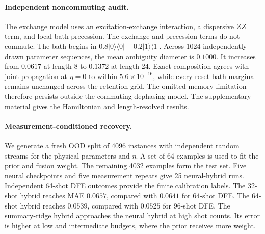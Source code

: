 \documentclass[12pt]{iopart}
\begin{document}
\paragraph*{Independent noncommuting audit.}
The exchange model uses an excitation-exchange interaction, a dispersive $ZZ$ term, and local bath precession. The exchange and precession terms do not commute. The bath begins in $0.8|0\rangle\langle0|+0.2|1\rangle\langle1|$. Across 1024 independently drawn parameter sequences, the mean ambiguity diameter is $0.1000$. It increases from $0.0617$ at length 8 to $0.1372$ at length 24. Exact composition agrees with joint propagation at $\eta=0$ to within $5.6\times10^{-16}$, while every reset-bath marginal remains unchanged across the retention grid. The omitted-memory limitation therefore persists outside the commuting dephasing model. The supplementary material gives the Hamiltonian and length-resolved results.

\paragraph*{Measurement-conditioned recovery.}
We generate a fresh OOD split of 4096 instances with independent random streams for the physical parameters and $\eta$. A set of 64 examples is used to fit the prior and fusion weight. The remaining 4032 examples form the test set. Five neural checkpoints and five measurement repeats give 25 neural-hybrid runs. Independent 64-shot DFE outcomes provide the finite calibration labels. The 32-shot hybrid reaches MAE $0.0657$, compared with $0.0641$ for 64-shot DFE. The 64-shot hybrid reaches $0.0539$, compared with $0.0525$ for 96-shot DFE. The summary-ridge hybrid approaches the neural hybrid at high shot counts. Its error is higher at low and intermediate budgets, where the prior receives more weight.
\end{document}
